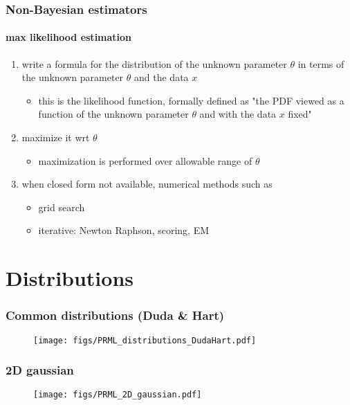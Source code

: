 \begin{frame}
\frametitle{Non-Bayesian estimators}
\framesubtitle{max likelihood estimation}
\logoEvolution\mypagenum
	\begin{enumerate}				
		\item write a formula for the distribution of the unknown parameter $\theta$ in terms of the unknown parameter $\theta$ and the data $x$
			\begin{itemize}
				\item this is the {\color{blue}likelihood function}, formally defined as "the PDF viewed as a function of the unknown parameter $\theta$ and with the data $x$ fixed"
			\end{itemize}
		\item maximize it wrt $\theta$
			\begin{itemize}
				\item maximization is performed over allowable range of $\theta$
			\end{itemize}
		\item when closed form not available, numerical methods such as
			\begin{itemize}
				\item grid search
				\item iterative: Newton Raphson, scoring, EM
			\end{itemize}
	\end{enumerate}	
\end{frame}


\section{Distributions}
\begin{frame}[plain]
\frametitle{Common distributions (Duda \& Hart)}
\mypagenum
	\begin{changemargin}{-1.3in}{0in}
		\begin{figure}				
			\texttt{[image: figs/PRML\_distributions\_DudaHart.pdf]}
		\end{figure}
	\end{changemargin}
\end{frame}


\begin{frame}
\frametitle{2D gaussian}
\logoEvolution\mypagenum
	\begin{figure}				
		\texttt{[image: figs/PRML\_2D\_gaussian.pdf]}
	\end{figure}
\end{frame}


